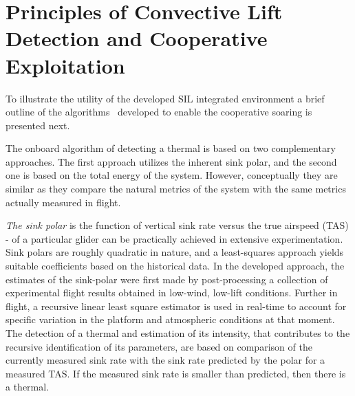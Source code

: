 \documentclass[letterpaper, 10 pt, conference]{ieeeconf}  %
\newcommand{\squeezeup}{\vspace{-1.0mm}}
\begin{document}
\section{Principles of Convective Lift Detection and Cooperative Exploitation}
\squeezeup
To illustrate the utility of the developed SIL integrated environment a brief outline of the algorithms~\cite{AKlass_JGCD:2012} developed to enable the cooperative soaring is presented next.

The onboard algorithm of detecting a thermal is based on two complementary approaches. The first approach utilizes the inherent sink polar, and the second one is based on the total energy of the system. However, conceptually they are similar as they compare the natural metrics of the system with the same metrics actually measured in flight.

\emph{The sink polar} is the function of vertical sink rate versus the true airspeed (TAS) - of a particular glider can be practically achieved in extensive experimentation. Sink polars are roughly quadratic in nature, and a least-squares approach yields suitable coefficients based on the historical data. In the developed approach, the estimates of the sink-polar were first made by post-processing a collection of experimental flight results obtained in low-wind, low-lift conditions. Further in flight, a recursive linear least square estimator is used in real-time to account for specific variation in the platform and atmospheric conditions at that moment. The detection of a thermal and estimation of its intensity, that contributes to the recursive identification of its parameters, are based on comparison of the currently measured sink rate with the sink rate predicted by the polar for a measured TAS. If the measured sink rate is smaller than predicted, then there is a thermal.
\end{document}
